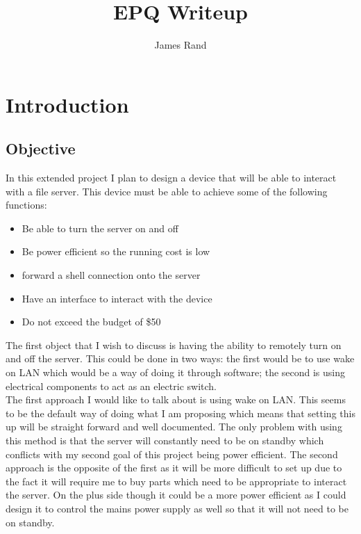 \documentclass{article}
\title{EPQ Writeup}
\date{}
\author{James Rand}
\begin{document}
\maketitle

\tableofcontents
\setcounter{tocdepth}{5}

\newpage

\section{Introduction}
\subsection{Objective}

In this extended project I plan to design a device that will be able to interact with a file
server. This device must be able to achieve some of the following functions:

\begin{itemize}
    \item Be able to turn the server on and off
    \item Be power efficient so the running cost is low
    \item forward a shell connection onto the server
    \item Have an interface to interact with the device
    \item Do not exceed the budget of \$50
\end{itemize}

The first object that I wish to discuss is having the ability to remotely turn on and off the
server. This could be done in two ways: the first would be to use wake on LAN which would be
a way of doing it through software; the second is using electrical components to act as an
electric switch. \\

The first approach I would like to talk about is using wake on LAN. This seems to be the default
way of doing what I am proposing which means that setting this up will be straight forward and
well documented. The only problem with using this method is that the server will constantly need
to be on standby which conflicts with my second goal of this project being power efficient. The
second approach is the opposite of the first as it will be more difficult to set up due to the
fact it will require me to buy parts which need to be appropriate to interact the server. On the
plus side though it could be a more power efficient as I could design it to control the mains
power supply as well so that it will not need to be on standby.
\end{document}
